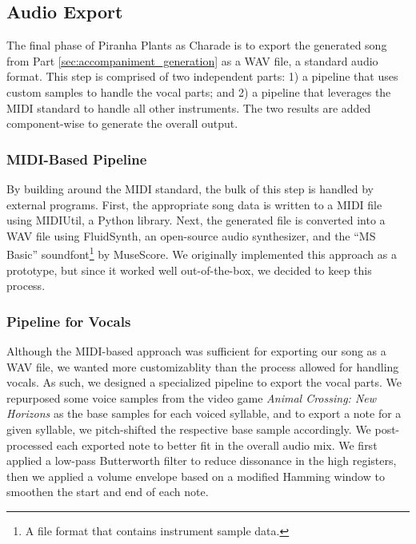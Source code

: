 \subsection{Audio Export}
\label{sec:audio_export}

The final phase of Piranha Plants as Charade is to export the generated song from Part \ref{sec:accompaniment_generation} as a WAV file, a standard audio format. This step is comprised of two independent parts: 1) a pipeline that uses custom samples to handle the vocal parts; and 2) a pipeline that leverages the MIDI standard to handle all other instruments. The two results are added component-wise to generate the overall output.

\subsubsection{MIDI-Based Pipeline}

By building around the MIDI standard, the bulk of this step is handled by external programs. First, the appropriate song data is written to a MIDI file using MIDIUtil, a Python library. Next, the generated file is converted into a WAV file using FluidSynth, an open-source audio synthesizer, and the ``MS Basic'' soundfont\footnote{A file format that contains instrument sample data.} by MuseScore. We originally implemented this approach as a prototype, but since it worked well out-of-the-box, we decided to keep this process.

\subsubsection{Pipeline for Vocals}

Although the MIDI-based approach was sufficient for exporting our song as a WAV file, we wanted more customizablity than the process allowed for handling vocals. As such, we designed a specialized pipeline to export the vocal parts. We repurposed some voice samples from the video game \emph{Animal Crossing: New Horizons} as the base samples for each voiced syllable, and to export a note for a given syllable, we pitch-shifted the respective base sample accordingly. We post-processed each exported note to better fit in the overall audio mix. We first applied a low-pass Butterworth filter to reduce dissonance in the high registers, then we applied a volume envelope based on a modified Hamming window to smoothen the start and end of each note.

